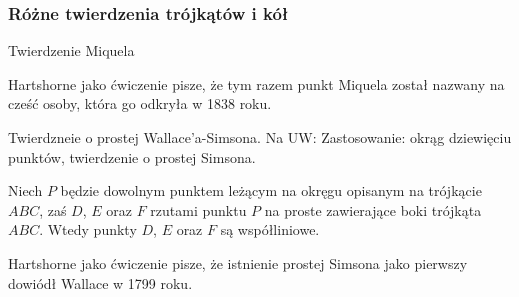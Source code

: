 






\subsubsection{Różne twierdzenia trójkątów i kół}
Twierdzenie Miquela
\loremipsum
{} %

Hartshorne jako ćwiczenie \cite[s. 61]{hartshorne2000} pisze, że tym razem punkt Miquela został nazwany na cześć osoby, która go odkryła w 1838 roku.

Twierdzneie o prostej Wallace'a-Simsona.
Na UW: Zastosowanie: okrąg dziewięciu punktów, twierdzenie o prostej Simsona.

\begin{proposition}
	Niech $P$ będzie dowolnym punktem leżącym na okręgu opisanym na trójkącie $ABC$, zaś $D$, $E$ oraz $F$ rzutami punktu $P$ na proste zawierające boki trójkąta $ABC$.
	Wtedy punkty $D$, $E$ oraz $F$ są współliniowe.
\end{proposition}

Hartshorne jako ćwiczenie \cite[s. 61]{hartshorne2000} pisze, że istnienie prostej Simsona jako pierwszy dowiódł Wallace w 1799 roku.